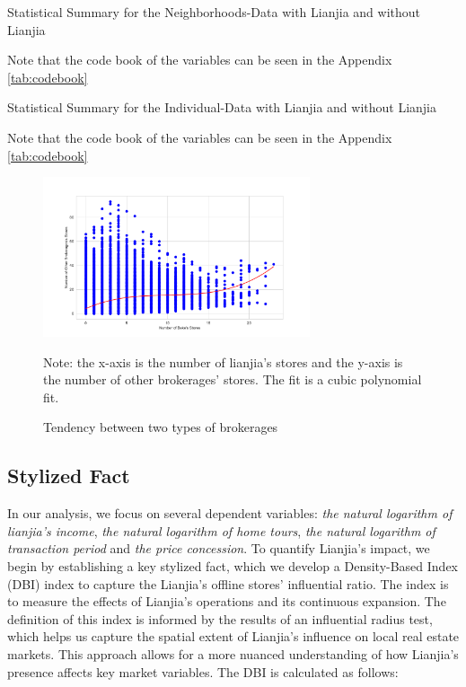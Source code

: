 \documentclass[11pt]{article}
\begin{document}
\begin{table}[htb!]
    \centering
    \begin{tiny}
    \caption{Statistical Summary for the Neighborhoods-Data with Lianjia and without Lianjia}
    
    \label{tab:statistical_district}

    Note that the code book of the variables can be seen in the Appendix \ref{tab:codebook}
    \end{tiny}
\end{table}

\begin{table}[htb!]
  \centering
  \begin{tiny}
  \caption{Statistical Summary for the Individual-Data with Lianjia and without Lianjia}
  
  \label{tab:statistical_individual}

  Note that the code book of the variables can be seen in the Appendix \ref{tab:codebook}
  \end{tiny}  
\end{table}

\begin{figure}
    \centering
    \includegraphics[width=0.7\textwidth]{../figures/scatter_plot_with_two_brokerages.pdf}
    \caption{Tendency between two types of brokerages}
    \label{fig:same_distribution}
    Note: the x-axis is the number of lianjia's stores and the y-axis is the number of other brokerages' stores. The fit is a cubic polynomial fit.
\end{figure}


\subsection{Stylized Fact} \label{subsec:stylized_fact}

In our analysis, we focus on several dependent variables: \emph{the natural logarithm of lianjia's income}, \emph{the natural logarithm of home tours}, \emph{the natural logarithm of transaction period} and \emph{the price concession}. To quantify Lianjia's impact, we begin by establishing a key stylized fact, which we develop a Density-Based Index (DBI) index to capture the Lianjia's offline stores' influential ratio. The index is to measure the effects of Lianjia's operations and its continuous expansion. The definition of this index is informed by the results of an influential radius test, which helps us capture the spatial extent of Lianjia's influence on local real estate markets. This approach allows for a more nuanced understanding of how Lianjia's presence affects key market variables. The DBI is calculated as follows:
\end{document}
